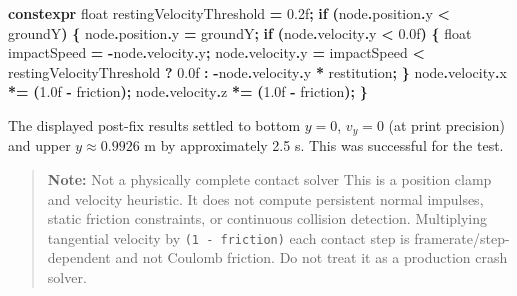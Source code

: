 \documentclass[
  10pt,
  a4paper,
]{article}
\newenvironment{Shaded}{\begin{snugshade}}{\end{snugshade}}
\newcommand{\BuiltInTok}[1]{#1}
\newcommand{\ControlFlowTok}[1]{\textcolor[rgb]{0.13,0.29,0.53}{\textbf{#1}}}
\newcommand{\DataTypeTok}[1]{\textcolor[rgb]{0.13,0.29,0.53}{#1}}
\newcommand{\FloatTok}[1]{\textcolor[rgb]{0.00,0.00,0.81}{#1}}
\newcommand{\KeywordTok}[1]{\textcolor[rgb]{0.13,0.29,0.53}{\textbf{#1}}}
\newcommand{\NormalTok}[1]{#1}
\newcommand{\OperatorTok}[1]{\textcolor[rgb]{0.81,0.36,0.00}{\textbf{#1}}}
\begin{document}
\begin{Shaded}
\begin{Highlighting}[]
\KeywordTok{constexpr} \DataTypeTok{float}\NormalTok{ restingVelocityThreshold }\OperatorTok{=} \FloatTok{0.2}\BuiltInTok{f}\OperatorTok{;}
\ControlFlowTok{if} \OperatorTok{(}\NormalTok{node}\OperatorTok{.}\NormalTok{position}\OperatorTok{.}\NormalTok{y }\OperatorTok{\textless{}}\NormalTok{ groundY}\OperatorTok{)} \OperatorTok{\{}
\NormalTok{    node}\OperatorTok{.}\NormalTok{position}\OperatorTok{.}\NormalTok{y }\OperatorTok{=}\NormalTok{ groundY}\OperatorTok{;}
    \ControlFlowTok{if} \OperatorTok{(}\NormalTok{node}\OperatorTok{.}\NormalTok{velocity}\OperatorTok{.}\NormalTok{y }\OperatorTok{\textless{}} \FloatTok{0.0}\BuiltInTok{f}\OperatorTok{)} \OperatorTok{\{}
        \DataTypeTok{float}\NormalTok{ impactSpeed }\OperatorTok{=} \OperatorTok{{-}}\NormalTok{node}\OperatorTok{.}\NormalTok{velocity}\OperatorTok{.}\NormalTok{y}\OperatorTok{;}
\NormalTok{        node}\OperatorTok{.}\NormalTok{velocity}\OperatorTok{.}\NormalTok{y }\OperatorTok{=}\NormalTok{ impactSpeed }\OperatorTok{\textless{}}\NormalTok{ restingVelocityThreshold}
                        \OperatorTok{?} \FloatTok{0.0}\BuiltInTok{f}
                        \OperatorTok{:} \OperatorTok{{-}}\NormalTok{node}\OperatorTok{.}\NormalTok{velocity}\OperatorTok{.}\NormalTok{y }\OperatorTok{*}\NormalTok{ restitution}\OperatorTok{;}
    \OperatorTok{\}}
\NormalTok{    node}\OperatorTok{.}\NormalTok{velocity}\OperatorTok{.}\NormalTok{x }\OperatorTok{*=} \OperatorTok{(}\FloatTok{1.0}\BuiltInTok{f} \OperatorTok{{-}}\NormalTok{ friction}\OperatorTok{);}
\NormalTok{    node}\OperatorTok{.}\NormalTok{velocity}\OperatorTok{.}\NormalTok{z }\OperatorTok{*=} \OperatorTok{(}\FloatTok{1.0}\BuiltInTok{f} \OperatorTok{{-}}\NormalTok{ friction}\OperatorTok{);}
\OperatorTok{\}}
\end{Highlighting}
\end{Shaded}

The displayed post-fix results settled to bottom \(y=0\), \(v_y=0\) (at
print precision) and upper \(y\approx0.9926\) m by approximately 2.5 s.
This was successful for the test.

\begin{quote}
\textbf{Note:} Not a physically complete contact solver This is a
position clamp and velocity heuristic. It does not compute persistent
normal impulses, static friction constraints, or continuous collision
detection. Multiplying tangential velocity by \texttt{(1\ -\ friction)}
each contact step is framerate/step-dependent and not Coulomb friction.
Do not treat it as a production crash solver.
\end{quote}
\end{document}
